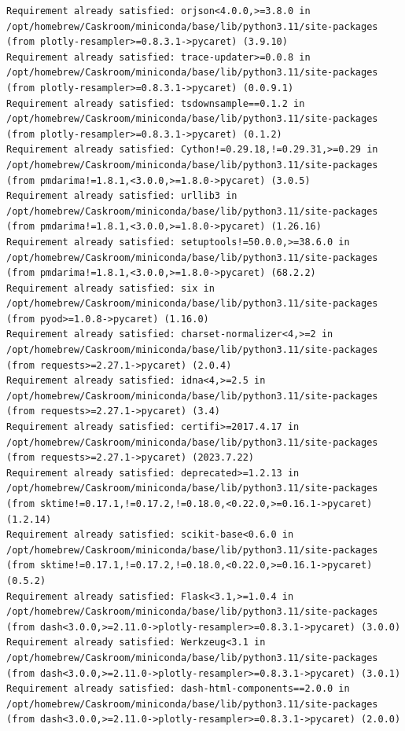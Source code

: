 \documentclass[
  letterpaper,
  DIV=11,
  numbers=noendperiod]{scrartcl}
\begin{document}
\begin{verbatim}
Requirement already satisfied: orjson<4.0.0,>=3.8.0 in /opt/homebrew/Caskroom/miniconda/base/lib/python3.11/site-packages (from plotly-resampler>=0.8.3.1->pycaret) (3.9.10)
Requirement already satisfied: trace-updater>=0.0.8 in /opt/homebrew/Caskroom/miniconda/base/lib/python3.11/site-packages (from plotly-resampler>=0.8.3.1->pycaret) (0.0.9.1)
Requirement already satisfied: tsdownsample==0.1.2 in /opt/homebrew/Caskroom/miniconda/base/lib/python3.11/site-packages (from plotly-resampler>=0.8.3.1->pycaret) (0.1.2)
Requirement already satisfied: Cython!=0.29.18,!=0.29.31,>=0.29 in /opt/homebrew/Caskroom/miniconda/base/lib/python3.11/site-packages (from pmdarima!=1.8.1,<3.0.0,>=1.8.0->pycaret) (3.0.5)
Requirement already satisfied: urllib3 in /opt/homebrew/Caskroom/miniconda/base/lib/python3.11/site-packages (from pmdarima!=1.8.1,<3.0.0,>=1.8.0->pycaret) (1.26.16)
Requirement already satisfied: setuptools!=50.0.0,>=38.6.0 in /opt/homebrew/Caskroom/miniconda/base/lib/python3.11/site-packages (from pmdarima!=1.8.1,<3.0.0,>=1.8.0->pycaret) (68.2.2)
Requirement already satisfied: six in /opt/homebrew/Caskroom/miniconda/base/lib/python3.11/site-packages (from pyod>=1.0.8->pycaret) (1.16.0)
Requirement already satisfied: charset-normalizer<4,>=2 in /opt/homebrew/Caskroom/miniconda/base/lib/python3.11/site-packages (from requests>=2.27.1->pycaret) (2.0.4)
Requirement already satisfied: idna<4,>=2.5 in /opt/homebrew/Caskroom/miniconda/base/lib/python3.11/site-packages (from requests>=2.27.1->pycaret) (3.4)
Requirement already satisfied: certifi>=2017.4.17 in /opt/homebrew/Caskroom/miniconda/base/lib/python3.11/site-packages (from requests>=2.27.1->pycaret) (2023.7.22)
Requirement already satisfied: deprecated>=1.2.13 in /opt/homebrew/Caskroom/miniconda/base/lib/python3.11/site-packages (from sktime!=0.17.1,!=0.17.2,!=0.18.0,<0.22.0,>=0.16.1->pycaret) (1.2.14)
Requirement already satisfied: scikit-base<0.6.0 in /opt/homebrew/Caskroom/miniconda/base/lib/python3.11/site-packages (from sktime!=0.17.1,!=0.17.2,!=0.18.0,<0.22.0,>=0.16.1->pycaret) (0.5.2)
Requirement already satisfied: Flask<3.1,>=1.0.4 in /opt/homebrew/Caskroom/miniconda/base/lib/python3.11/site-packages (from dash<3.0.0,>=2.11.0->plotly-resampler>=0.8.3.1->pycaret) (3.0.0)
Requirement already satisfied: Werkzeug<3.1 in /opt/homebrew/Caskroom/miniconda/base/lib/python3.11/site-packages (from dash<3.0.0,>=2.11.0->plotly-resampler>=0.8.3.1->pycaret) (3.0.1)
Requirement already satisfied: dash-html-components==2.0.0 in /opt/homebrew/Caskroom/miniconda/base/lib/python3.11/site-packages (from dash<3.0.0,>=2.11.0->plotly-resampler>=0.8.3.1->pycaret) (2.0.0)

\end{verbatim}
\end{document}
